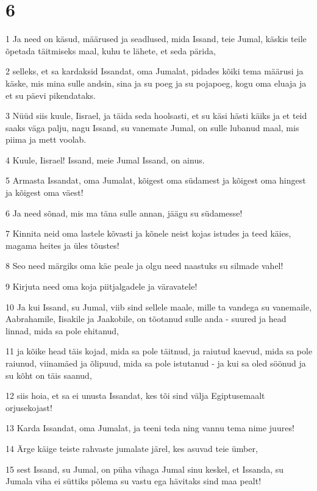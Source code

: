 \chapter{6}

\par 1 Ja need on käsud, määrused ja seadlused, mida Issand, teie Jumal, käskis teile õpetada täitmiseks maal, kuhu te lähete, et seda pärida,
\par 2 selleks, et sa kardaksid Issandat, oma Jumalat, pidades kõiki tema määrusi ja käske, mis mina sulle andsin, sina ja su poeg ja su pojapoeg, kogu oma eluaja ja et su päevi pikendataks.
\par 3 Nüüd siis kuule, Iisrael, ja täida seda hoolsasti, et su käsi hästi käiks ja et teid saaks väga palju, nagu Issand, su vanemate Jumal, on sulle lubanud maal, mis piima ja mett voolab.
\par 4 Kuule, Iisrael! Issand, meie Jumal Issand, on ainus.
\par 5 Armasta Issandat, oma Jumalat, kõigest oma südamest ja kõigest oma hingest ja kõigest oma väest!
\par 6 Ja need sõnad, mis ma täna sulle annan, jäägu su südamesse!
\par 7 Kinnita neid oma lastele kõvasti ja kõnele neist kojas istudes ja teed käies, magama heites ja üles tõustes!
\par 8 Seo need märgiks oma käe peale ja olgu need naastuks su silmade vahel!
\par 9 Kirjuta need oma koja piitjalgadele ja väravatele!
\par 10 Ja kui Issand, su Jumal, viib sind sellele maale, mille ta vandega su vanemaile, Aabrahamile, Iisakile ja Jaakobile, on tõotanud sulle anda - suured ja head linnad, mida sa pole ehitanud,
\par 11 ja kõike head täis kojad, mida sa pole täitnud, ja raiutud kaevud, mida sa pole raiunud, viinamäed ja õlipuud, mida sa pole istutanud - ja kui sa oled söönud ja su kõht on täis saanud,
\par 12 siis hoia, et sa ei unusta Issandat, kes tõi sind välja Egiptusemaalt orjusekojast!
\par 13 Karda Issandat, oma Jumalat, ja teeni teda ning vannu tema nime juures!
\par 14 Ärge käige teiste rahvaste jumalate järel, kes asuvad teie ümber,
\par 15 sest Issand, su Jumal, on püha vihaga Jumal sinu keskel, et Issanda, su Jumala viha ei süttiks põlema su vastu ega hävitaks sind maa pealt!
